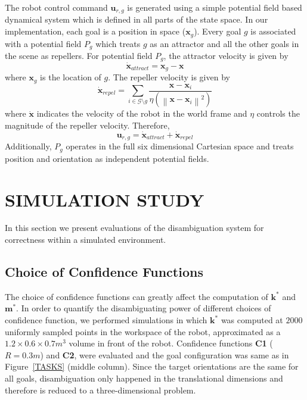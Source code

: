 \documentclass[conference]{IEEEtran}
\newcommand{\norm}[1]{\left\lVert#1\right\rVert}
\begin{document}
The robot control command $\boldsymbol{u}_{r,g}$ is generated using a simple potential field based dynamical system which is defined in all parts of the state space. In our implementation, each goal is a position in space ($\boldsymbol{x}_g$). Every goal $g$ is associated with a potential field $P_g$ which treats $g$ as an attractor and all the other goals in the scene as repellers. For potential field $P_g$, the attractor velocity is given by
\begin{equation*}
\dot{\boldsymbol{x}}_{attract} = \boldsymbol{x}_{g} - \boldsymbol{x}
\end{equation*}
where $\boldsymbol{x}_{g}$ is the location of $g$. The repeller velocity is given by
\begin{equation*}
\dot{\boldsymbol{x}}_{repel} = \sum_{i \in \mathcal{G} \setminus g} \frac{\boldsymbol{x} - \boldsymbol{x}_{i}}{\eta(\norm{\boldsymbol{x} - \boldsymbol{x}_{i}}^2)}
\end{equation*}
where $\dot{\boldsymbol{x}}$ indicates the velocity of the robot in the world frame and $\eta$ controls the magnitude of the repeller velocity. Therefore, 
\begin{equation*}
\boldsymbol{u}_{r,g} = \dot{\boldsymbol{x}}_{attract} + \dot{\boldsymbol{x}}_{repel} 
\end{equation*}
Additionally, $P_g$ operates in the full six dimensional Cartesian space and treats position and orientation as independent potential fields. 

\section{SIMULATION STUDY} \label{SIMRESULTS}
In this section we present evaluations of the disambiguation system for correctness within a simulated environment.

\subsection{Choice of Confidence Functions}
The choice of confidence functions can greatly affect the computation of $\boldsymbol{k}^*$ and $\boldsymbol{m}^*$. In order to quantify the disambiguating power of different choices of confidence function, we performed simulations in which $\boldsymbol{k}^*$ was computed at $2000$ uniformly sampled points in the workspace of the robot, approximated as a $1.2\times0.6\times0.7 m^3$ volume in front of the robot. Confidence functions \textbf{C1} ($R=0.3m$) and \textbf{C2}, were evaluated and the goal configuration was same as in Figure~\ref{TASKS} (middle column). Since the target orientations are the same for all goals, disambiguation only happened in the translational dimensions and therefore is reduced to a three-dimensional problem. 
\end{document}
